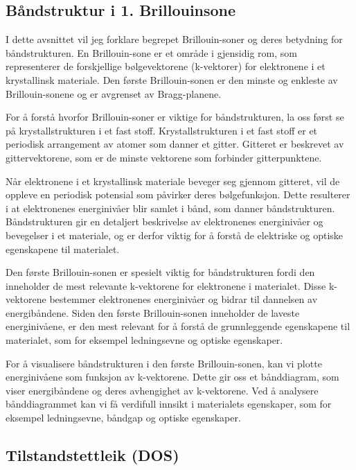 \homeworkProblem[6]

\subsection*{Båndstruktur i 1. Brillouinsone}

I dette avsnittet vil jeg forklare begrepet Brillouin-soner og deres betydning for båndstrukturen. En Brillouin-sone er et område i gjensidig rom, som representerer de forskjellige bølgevektorene (k-vektorer) for elektronene i et krystallinsk materiale. Den første Brillouin-sonen er den minste og enkleste av Brillouin-sonene og er avgrenset av Bragg-planene.

For å forstå hvorfor Brillouin-soner er viktige for båndstrukturen, la oss først se på krystallstrukturen i et fast stoff. Krystallstrukturen i et fast stoff er et periodisk arrangement av atomer som danner et gitter. Gitteret er beskrevet av gittervektorene, som er de minste vektorene som forbinder gitterpunktene.

Når elektronene i et krystallinsk materiale beveger seg gjennom gitteret, vil de oppleve en periodisk potensial som påvirker deres bølgefunksjon. Dette resulterer i at elektronenes energinivåer blir samlet i bånd, som danner båndstrukturen. Båndstrukturen gir en detaljert beskrivelse av elektronenes energinivåer og bevegelser i et materiale, og er derfor viktig for å forstå de elektriske og optiske egenskapene til materialet.

Den første Brillouin-sonen er spesielt viktig for båndstrukturen fordi den inneholder de mest relevante k-vektorene for elektronene i materialet. Disse k-vektorene bestemmer elektronenes energinivåer og bidrar til dannelsen av energibåndene. Siden den første Brillouin-sonen inneholder de laveste energinivåene, er den mest relevant for å forstå de grunnleggende egenskapene til materialet, som for eksempel ledningsevne og optiske egenskaper.

For å visualisere båndstrukturen i den første Brillouin-sonen, kan vi plotte energinivåene som funksjon av k-vektorene. Dette gir oss et bånddiagram, som viser energibåndene og deres avhengighet av k-vektorene. Ved å analysere bånddiagrammet kan vi få verdifull innsikt i materialets egenskaper, som for eksempel ledningsevne, båndgap og optiske egenskaper.

\subsection*{Tilstandstettleik (DOS)}

